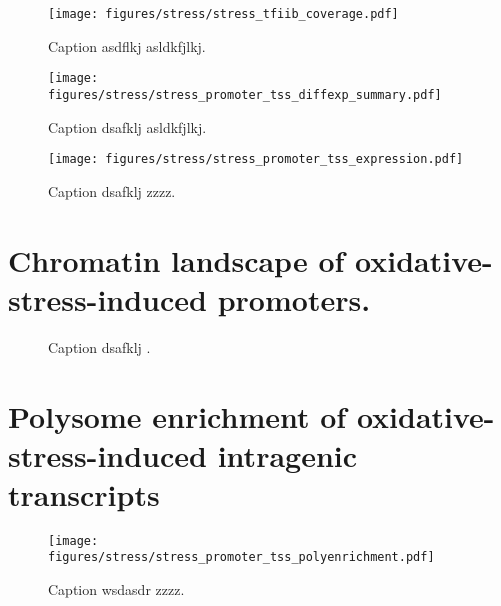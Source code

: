\begin{figure}
\texttt{[image: figures/stress/stress\_tfiib\_coverage.pdf]}
\label{fig:stress_tfiib_coverage}
\caption[TFIIB ChIP-nexus protection over four genes with stress-induced intragenic TFIIB peaks.]{Caption asdflkj asldkfjlkj.}
\end{figure}

\begin{figure}
\texttt{[image: figures/stress/stress\_promoter\_tss\_diffexp\_summary.pdf]}
\caption[Bar plot of the number of promoters from various genomic classes differentially expressed in oxidative stress.]{Caption dsafklj asldkfjlkj.}
\label{fig:stress_promoter_tss_diffexp_summary}
\end{figure}

\begin{figure}
\texttt{[image: figures/stress/stress\_promoter\_tss\_expression.pdf]}
\caption[TSS-seq expression levels in oxidative stress of oxidative-stress-induced genic and intragenic promoters.]{Caption dsafklj zzzz.}
\label{fig:stress_promoter_tss_diffexp_summary}
\end{figure}

\section{Chromatin landscape of oxidative-stress-induced promoters.}

\lipsum[1]

\begin{figure}
\caption[A figure showing TSS-seq, TFIIB ChIP-nexus, and MNase-ChIP-seq for the oxidative-stress-induced promoters.]{Caption dsafklj .}
\end{figure}

\section{Polysome enrichment of oxidative-stress-induced intragenic transcripts}

\lipsum[1]

\begin{figure}
\texttt{[image: figures/stress/stress\_promoter\_tss\_polyenrichment.pdf]}
\caption[Polysome enrichment in oxidative stress, for oxidative-stress-induced genic and intragenic promoters.]{Caption wsdasdr zzzz.}
\label{fig:stress_promoter_tss_polyenrichment}
\end{figure}

